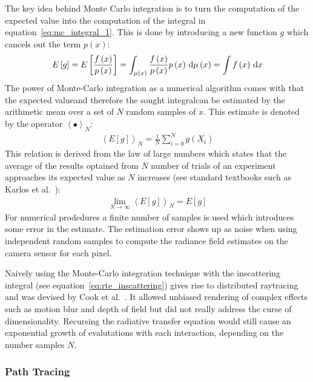 The key idea behind Monte Carlo integration is to turn the computation of the expected value into the computation of the integral in equation~\ref{eq:mc_integral_1}. This is done by introducing a new function $g$ which cancels out the term $p\left(x\right)$:
\begin{align}
E\left[g\right]
=E\left[\frac{f\left(x\right)}{p\left(x\right)}\right]
= \int_{\mu\left(x\right)} \frac{f\left(x\right)}{p\left(x\right)}p\left(x\right)\,\mathrm{d}\mu\left(x\right)
=\int f\left(x\right)\,\mathrm{d} x
\end{align}
The power of Monte-Carlo integration as a numerical algorithm comes with that the expected value\mydash and therefore the sought integral\mydash can be estimated by the arithmetic mean over a set of $N$ random samples of $x$. This estimate is denoted by the operator $\left<\bullet\right>_N$:
\begin{align}
\left<E[g]\right>_N = 
\frac{1}{N}\sum_{i=0}^{N}
g\left(X_i\right)
\end{align}
This relation is derived from the law of large numbers which states that the average of the results optained from $N$ number of trials of an experiment approaches its expected value as $N$ increases (see standard textbooks such as Karlos et al.~\cite{Kalos86}):
\begin{align}
\lim_{N\rightarrow\infty} \left<E[g]\right>_N = E[g]
\end{align}
For numerical prodedures a finite number of samples is used which introduces some error in the estimate. The estimation error shows up as noise when using independent random samples to compute the radiance field estimates on the camera sensor for each pixel.

Naively using the Monte-Carlo integration technique with the inscattering integral (see equation~\ref{eq:rte_inscattering}) gives rise to distributed raytracing and was devised by Cook et al.~\cite{Cook84}. It allowed unbiased rendering of complex effects such as motion blur and depth of field but did not really address the curse of dimensionality. Recursing the radiative transfer equation would still cause an exponential growth of evalutations with each interaction, depending on the number samples $N$.


\subsubsection*{Path Tracing}

